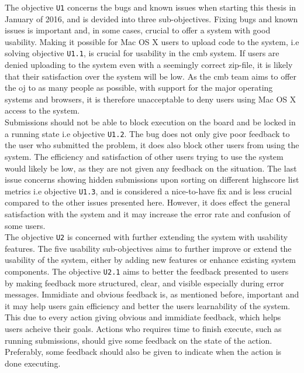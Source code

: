 The objective \texttt{U1} concerns the bugs and known issues when starting this thesis in January of 2016, and is devided into three sub-objectives. Fixing bugs and known issues is important and, in some cases, crucial to offer a system with good usability. Making it possible for Mac OS X users to upload code to the system, i.e solving objective \texttt{U1.1}, is crucial for usability in the \gls{cmb} system. If users are denied uploading to the system even with a seemingly correct zip-file, it is likely that their satisfaction over the system will be low. As the \gls{cmb} team aims to offer the \gls{oj} to as many people as possible, with support for the major operating systems and browsers, it is therefore unacceptable to deny users using Mac OS X access to the system. \\

Submissions should not be able to block execution on the board and be locked in a running state i.e objective \texttt{U1.2}. The bug does not only give poor feedback to the user who submitted the problem, it does also block other users from using the system. The efficiency and satisfaction of other users trying to use the system would likely be low, as they are not given any feedback on the situation. The last issue concerns showing hidden submissions upon sorting on different highscore list metrics i.e objective \texttt{U1.3}, and is considered a nice-to-have fix and is less crucial compared to the other issues presented here. However, it does effect the general satisfaction with the system and it may increase the error rate and confusion of some users. \\

The objective \texttt{U2} is concerned with further extending the system with usability features. The five usability sub-objectives aims to further improve or extend the usability of the system, either by adding new features or enhance existing system components. The objective \texttt{U2.1} aims to better the feedback presented to users by making feedback more structured, clear, and visible especially during error messages. Immidiate and obvious feedback is, as mentioned before, important and it may help users gain efficiency and better the users learnability of the system. This due to every action giving obvious and immidiate feedback, which helps users acheive their goals. Actions who requires time to finish execute, such as running submissions, should give some feedback on the state of the action. Preferably, some feedback should also be given to indicate when the action is done executing. \\


